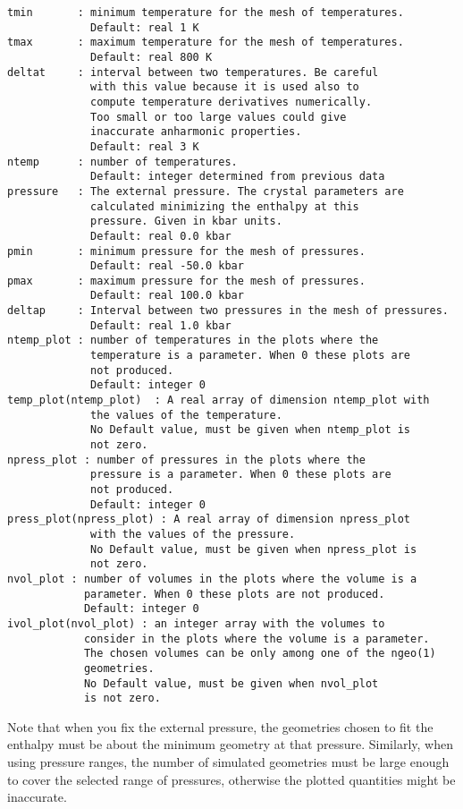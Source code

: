 \documentclass[12pt,a4paper,twoside]{report}
\begin{document}
\begin{verbatim}
tmin       : minimum temperature for the mesh of temperatures.
             Default: real 1 K
tmax       : maximum temperature for the mesh of temperatures.
             Default: real 800 K
deltat     : interval between two temperatures. Be careful 
             with this value because it is used also to 
             compute temperature derivatives numerically. 
             Too small or too large values could give 
             inaccurate anharmonic properties.
             Default: real 3 K
ntemp      : number of temperatures.
             Default: integer determined from previous data
pressure   : The external pressure. The crystal parameters are
             calculated minimizing the enthalpy at this 
             pressure. Given in kbar units. 
             Default: real 0.0 kbar
pmin       : minimum pressure for the mesh of pressures.
             Default: real -50.0 kbar
pmax       : maximum pressure for the mesh of pressures.
             Default: real 100.0 kbar
deltap     : Interval between two pressures in the mesh of pressures.
             Default: real 1.0 kbar
ntemp_plot : number of temperatures in the plots where the 
             temperature is a parameter. When 0 these plots are 
             not produced.
             Default: integer 0
temp_plot(ntemp_plot)  : A real array of dimension ntemp_plot with 
             the values of the temperature.
             No Default value, must be given when ntemp_plot is 
             not zero.
npress_plot : number of pressures in the plots where the 
             pressure is a parameter. When 0 these plots are 
             not produced.
             Default: integer 0
press_plot(npress_plot) : A real array of dimension npress_plot 
             with the values of the pressure.
             No Default value, must be given when npress_plot is 
             not zero.
nvol_plot : number of volumes in the plots where the volume is a 
            parameter. When 0 these plots are not produced.
            Default: integer 0
ivol_plot(nvol_plot) : an integer array with the volumes to 
            consider in the plots where the volume is a parameter. 
            The chosen volumes can be only among one of the ngeo(1) 
            geometries.
            No Default value, must be given when nvol_plot 
            is not zero.
\end{verbatim}

Note that when you fix the external pressure, the geometries chosen to 
fit the enthalpy must be about the minimum geometry at that pressure.
Similarly, when using pressure ranges, the number of simulated geometries 
must be large enough to cover the selected range of pressures, otherwise 
the plotted quantities might be inaccurate.
\end{document}
